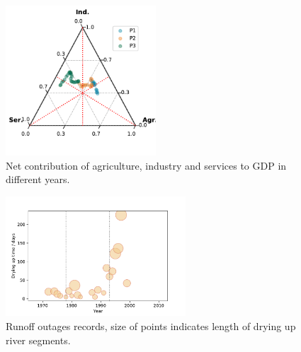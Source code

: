 \documentclass[9pt,twoside,lineno]{pnas-new}
\begin{document}
\begin{figure}
    \centering
    \includegraphics[width=0.5\textwidth]{../../figures/sup/ternary.pdf}
    \caption{Net contribution of agriculture, industry and services to GDP in different years.}
\end{figure}


\begin{figure}
    \centering
    \includegraphics[width=0.6\textwidth]{../../figures/sup/outages.pdf}
    \caption{Runoff outages records, size of points indicates length of drying up river segments.}
\end{figure}


\end{document}
